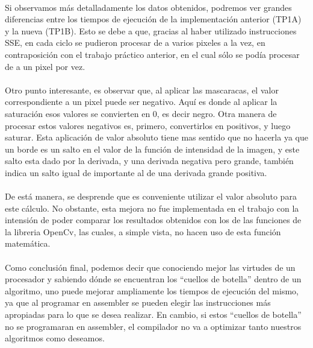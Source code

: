 \documentclass[11pt, a4paper]{article}
\begin{document}
\paragraph{}
Si observamos m\'as detalladamente los datos obtenidos, podremos ver grandes diferencias entre los tiempos de ejecuci\'on de la implementaci\'on anterior (TP1A) y la nueva (TP1B). Esto se debe a que, gracias al haber utilizado instrucciones SSE, en cada ciclo se pudieron procesar de a varios pixeles a la vez, en contraposici\'on con el trabajo pr\'actico anterior, en el cual s\'olo se pod\'ia procesar de a un pixel por vez.

\paragraph{}
Otro punto interesante, es observar que, al aplicar las mascaracas, el valor correspondiente a un pixel puede ser negativo. Aqu\'i es donde al aplicar la saturaci\'on esos valores se convierten en 0, es decir negro. Otra manera de procesar estos valores negativos es, primero, convertirlos en positivos, y luego saturar. Esta aplicaci\'on de valor absoluto tiene mas sentido que no hacerla ya que un borde es un salto en el valor de la funci\'on de intensidad de la imagen, y este salto esta dado por la derivada, y una derivada negativa pero grande, tambi\'en indica un salto igual de importante al de una derivada grande positiva.

\paragraph{}
De est\'a manera, se desprende que es conveniente utilizar el valor absoluto para este c\'alculo. No obstante, esta mejora no fue implementada en el trabajo con la intensi\'on de poder comparar los resultados obtenidos con los de las funciones de la libreria OpenCv, las cuales, a simple vista, no hacen uso de esta funci\'on matem\'atica.

\paragraph{}
Como conclusi\'on final, podemos decir que conociendo mejor las virtudes de un procesador y sabiendo d\'onde se encuentran los ``cuellos de botella'' dentro de un algoritmo, uno puede mejorar ampliamente los tiempos de ejecuci\'on del mismo, ya que al programar en assembler se pueden elegir las instrucciones m\'as apropiadas para lo que se desea realizar. En cambio, si estos ``cuellos de botella'' no se programaran en assembler, el compilador no va a optimizar tanto nuestros algoritmos como deseamos.
\end{document}
